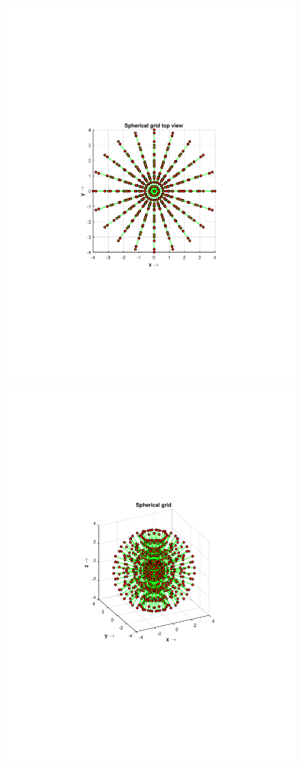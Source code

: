 \documentclass{UCF_ETD}
\begin{document}
\begin{figure}[H]
\begin{center}
 \includegraphics[scale=0.6]{PolarSphericalDFT/SphericalGridTopView}
 \includegraphics[scale=0.6]{PolarSphericalDFT/SphericalGrid}

\end{center}
\end{figure}
\end{document}
